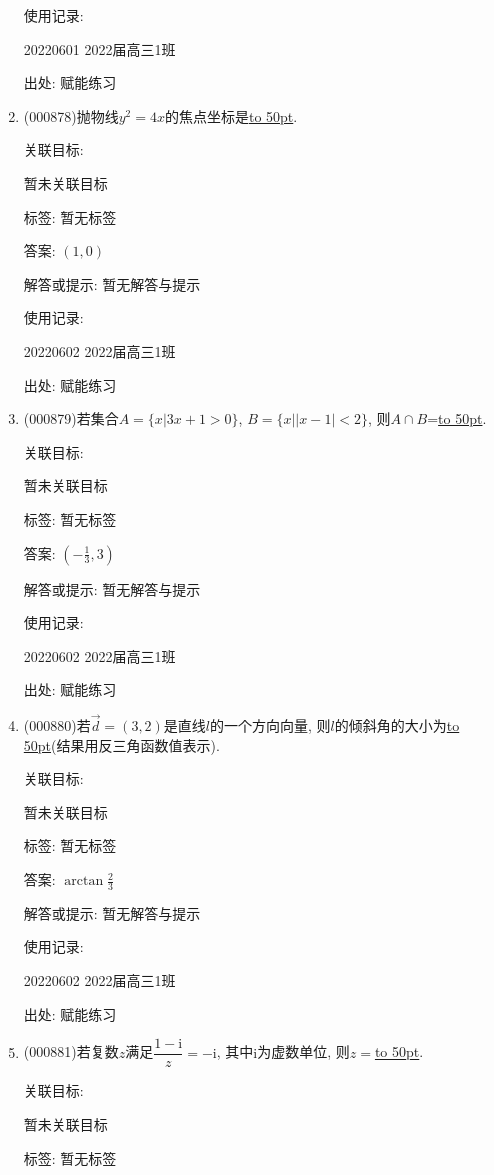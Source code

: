 \documentclass[10pt,a4paper]{article}
\newcommand{\blank}[1]{\underline{\hbox to #1pt{}}}
\begin{document}
\begin{enumerate}[1.]
使用记录:

20220601	2022届高三1班	


出处: 赋能练习
\item { (000878)}抛物线$y^2=4x$的焦点坐标是\blank{50}.


关联目标:

暂未关联目标



标签: 暂无标签

答案: $(1,0)$

解答或提示: 暂无解答与提示

使用记录:

20220602	2022届高三1班	


出处: 赋能练习
\item { (000879)}若集合$A=\{x|3x+1>0\}$, $B=\{x||x-1|<2\}$, 则$A\cap B$=\blank{50}.


关联目标:

暂未关联目标



标签: 暂无标签

答案: $(-\frac 13,3)$

解答或提示: 暂无解答与提示

使用记录:

20220602	2022届高三1班	


出处: 赋能练习
\item { (000880)}若$\overrightarrow d=(3,2)$是直线$l$的一个方向向量, 则$l$的倾斜角的大小为\blank{50}(结果用反三角函数值表示).


关联目标:

暂未关联目标



标签: 暂无标签

答案: $\arctan \frac 23$

解答或提示: 暂无解答与提示

使用记录:

20220602	2022届高三1班	


出处: 赋能练习
\item { (000881)}若复数$z$满足$\dfrac{1-\mathrm{i}}z=-\mathrm{i}$, 其中$\mathrm{i}$为虚数单位, 则$z=$\blank{50}.


关联目标:

暂未关联目标



标签: 暂无标签


\end{enumerate}
\end{document}
